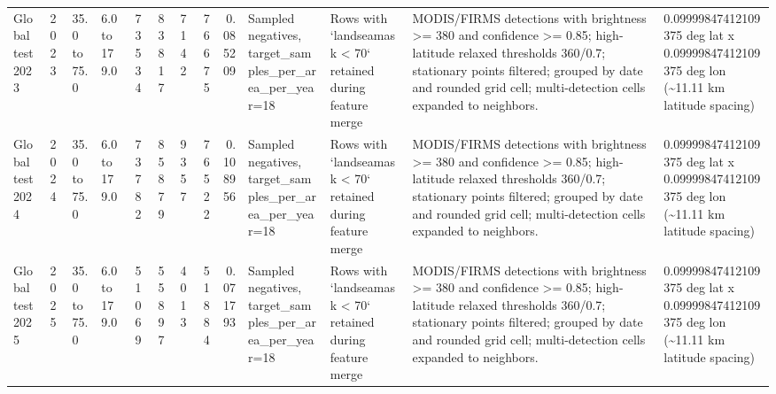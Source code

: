 \begin{table}
\begin{tabular}{llllrrrrrllll}
Global test 2023 & 2023 & 35.0 to 75.0 & 6.0 to 179.0 & 73534 & 83817 & 7142 & 76675 & 0.085209 & Sampled negatives, target\_samples\_per\_area\_per\_year=18 & Rows with `landseamask < 70` retained during feature merge & MODIS/FIRMS detections with brightness >= 380 and confidence >= 0.85; high-latitude relaxed thresholds 360/0.7; stationary points filtered; grouped by date and rounded grid cell; multi-detection cells expanded to neighbors. & 0.09999847412109375 deg lat x 0.09999847412109375 deg lon (\textasciitilde 11.11 km latitude spacing) \\
Global test 2024 & 2024 & 35.0 to 75.0 & 6.0 to 179.0 & 73782 & 85879 & 9357 & 76522 & 0.108956 & Sampled negatives, target\_samples\_per\_area\_per\_year=18 & Rows with `landseamask < 70` retained during feature merge & MODIS/FIRMS detections with brightness >= 380 and confidence >= 0.85; high-latitude relaxed thresholds 360/0.7; stationary points filtered; grouped by date and rounded grid cell; multi-detection cells expanded to neighbors. & 0.09999847412109375 deg lat x 0.09999847412109375 deg lon (\textasciitilde 11.11 km latitude spacing) \\
Global test 2025 & 2025 & 35.0 to 75.0 & 6.0 to 179.0 & 51069 & 55897 & 4013 & 51884 & 0.071793 & Sampled negatives, target\_samples\_per\_area\_per\_year=18 & Rows with `landseamask < 70` retained during feature merge & MODIS/FIRMS detections with brightness >= 380 and confidence >= 0.85; high-latitude relaxed thresholds 360/0.7; stationary points filtered; grouped by date and rounded grid cell; multi-detection cells expanded to neighbors. & 0.09999847412109375 deg lat x 0.09999847412109375 deg lon (\textasciitilde 11.11 km latitude spacing) \\
\bottomrule
\end{tabular}
\end{table}
